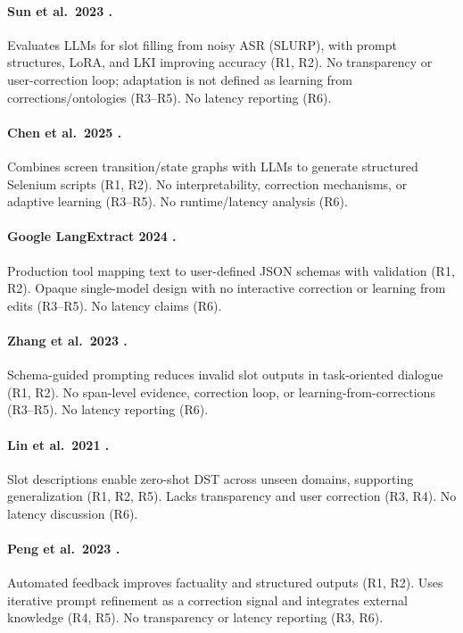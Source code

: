 \paragraph{Sun et al.\ 2023 \cite{sun2023slot}.}
Evaluates LLMs for slot filling from noisy ASR (SLURP), with prompt structures, LoRA, and LKI improving accuracy (R1, R2). No transparency or user-correction loop; adaptation is not defined as learning from corrections/ontologies (R3--R5). No latency reporting (R6).

\paragraph{Chen et al.\ 2025 \cite{le2025automated}.}
Combines screen transition/state graphs with LLMs to generate structured Selenium scripts (R1, R2). No interpretability, correction mechanisms, or adaptive learning (R3--R5). No runtime/latency analysis (R6).

\paragraph{Google LangExtract 2024 \cite{google2024langextract}.}
Production tool mapping text to user-defined JSON schemas with validation (R1, R2). Opaque single-model design with no interactive correction or learning from edits (R3--R5). No latency claims (R6).

\paragraph{Zhang et al.\ 2023 \cite{zhang2023sgptod}.}
Schema-guided prompting reduces invalid slot outputs in task-oriented dialogue (R1, R2). No span-level evidence, correction loop, or learning-from-corrections (R3--R5). No latency reporting (R6).

\paragraph{Lin et al.\ 2021 \cite{lin2021leveraging}.}
Slot descriptions enable zero-shot DST across unseen domains, supporting generalization (R1, R2, R5). Lacks transparency and user correction (R3, R4). No latency discussion (R6).

\paragraph{Peng et al.\ 2023 \cite{peng2023check}.}
Automated feedback improves factuality and structured outputs (R1, R2). Uses iterative prompt refinement as a correction signal and integrates external knowledge (R4, R5). No transparency or latency reporting (R3, R6).

